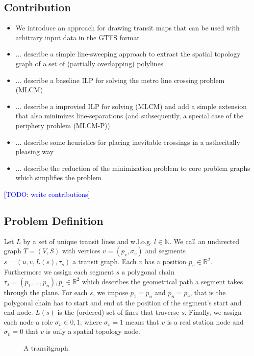 \documentclass{llncs}
\newcommand\todo[1]{\textcolor{blue}{[TODO: #1]}}
\begin{document}
%
\subsection{Contribution}\label{SEC:contrib}
%
\begin{itemize}
	\item We introduce an approach for drawing transit maps that can be used with arbitrary input data in the GTFS format
	\item ... describe a simple line-sweeping approach to extract the spatial topology graph of a set of (partially overlapping) polylines
	\item ... describe a baseline ILP for solving the metro line crossing problem (MLCM)
	\item ... describe a improvied ILP for solving (MLCM) and add a simple extension that also minimizes line-separations (and subsequently, a special case of the periphery problem (MLCM-P))
	\item ... describe some heuristics for placing inevitable crossings in a asthecitally pleasing way
	\item ... describe the reduction of the minimization problem to core problem graphs which simplifies the problem
\end{itemize}

\todo{write contributions}

%
\subsection{Problem Definition}\label{SEC:def}
%
Let $L$ by a set of unique transit lines and w.l.o.g. $l \in \mathbb{N}$. We call an undirected graph $T = (V, S)$ with vertices $v = (p_v, \sigma_v)$ and segments $s = (u, v, L(s), \tau_s)$ a transit graph. Each $v$ has a position $p_v \in \mathbb{R}^2$. Furthermore we assign each segment $s$ a polygonal chain $\tau_s = (p_1, ..., p_n), p_i \in \mathbb{R}^2$ which describes the geometrical path a segment takes through the plane. For each $s$, we impose $p_1 = p_u$ and $p_n = p_v$, that is the polygonal chain has to start and end at the position of the segment's start and end node. $L(s)$ is the (ordered) set of lines that traverse $s$. Finally, we assign each node a role $\sigma_v \in {0, 1}$, where $\sigma_v = 1$ means that $v$ is a real station node and $\sigma_v = 0$ that $v$ is only a spatial topology node.

\begin{figure}[h]
\centering
	
	\caption{A transitgraph.}
\end{figure}
\end{document}
